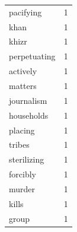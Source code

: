 \begin{tabular}{lr}
pacifying & 1 \\
khan & 1 \\
khizr & 1 \\
perpetuating & 1 \\
actively & 1 \\
matters & 1 \\
journalism & 1 \\
households & 1 \\
placing & 1 \\
tribes & 1 \\
sterilizing & 1 \\
forcibly & 1 \\
murder & 1 \\
kills & 1 \\
group & 1 \\
\bottomrule
\end{tabular}
